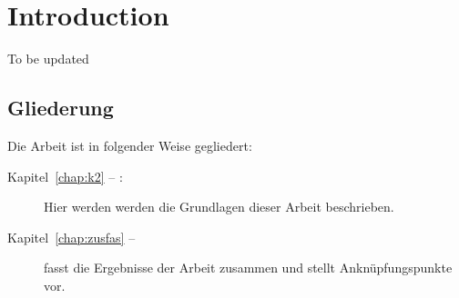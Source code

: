 \chapter{Introduction}
To be updated

\section*{Gliederung}
Die Arbeit ist in folgender Weise gegliedert:
\begin{description}
\item[Kapitel~\ref{chap:k2} -- :] Hier werden werden die Grundlagen dieser Arbeit beschrieben.
\item[Kapitel~\ref{chap:zusfas} -- ] fasst die Ergebnisse der Arbeit zusammen und stellt Anknüpfungspunkte vor.
\end{description}
